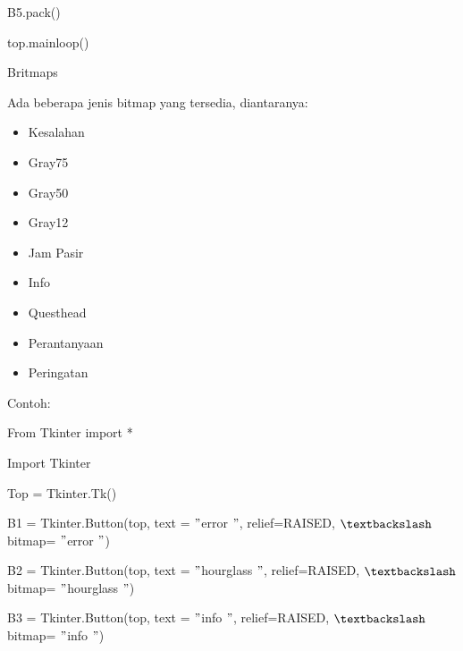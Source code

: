 \documentclass{wileySix}
\begin{document}
\begin{myEnumerate}
{\begin{myEnumerate}
	{\fontsize{10pt}{10pt}\selectfont B5.pack()} \par
	{\fontsize{10pt}{10pt}\selectfont top.mainloop()} \par
	\noindent 
	\item Britmaps \par
	\noindent 
	Ada beberapa jenis bitmap yang tersedia, diantaranya: \par
	\noindent 
	\begin{itemize}
		\item Kesalahan \par
		\noindent 
		\item Gray75 \par
		\noindent 
		\item Gray50 \par
		\noindent 
		\item Gray12 \par
		\noindent 
		\item Jam Pasir \par
		\noindent 
		\item Info \par
		\noindent 
		\item Questhead \par
		\noindent 
		\item Perantanyaan  \par
		\noindent 
		\item Peringatan\end{itemize}
	\par
	\vspace{12pt}
	Contoh: \par
	{\fontsize{10pt}{10pt}\selectfont From Tkinter import *} \par
	{\fontsize{10pt}{10pt}\selectfont Import Tkinter} \par
	\vspace{10pt}
	{\fontsize{10pt}{10pt}\selectfont Top = Tkinter.Tk()} \par
	\vspace{10pt}
	{\fontsize{10pt}{10pt}\selectfont B1 = Tkinter.Button(top, text = $ " $error $ " $, relief=RAISED,  $  \textbackslash  $ bitmap= $ " $error $ " $)} \par
	{\fontsize{10pt}{10pt}\selectfont B2 = Tkinter.Button(top, text = $ " $hourglass $ " $, relief=RAISED,  $  \textbackslash  $ bitmap= $ " $hourglass $ " $)} \par
	{\fontsize{10pt}{10pt}\selectfont B3 = Tkinter.Button(top, text = $ " $info $ " $, relief=RAISED,  $  \textbackslash  $ bitmap= $ " $info $ " $)} \par

\end{myEnumerate}}
\end{myEnumerate}
\end{document}
